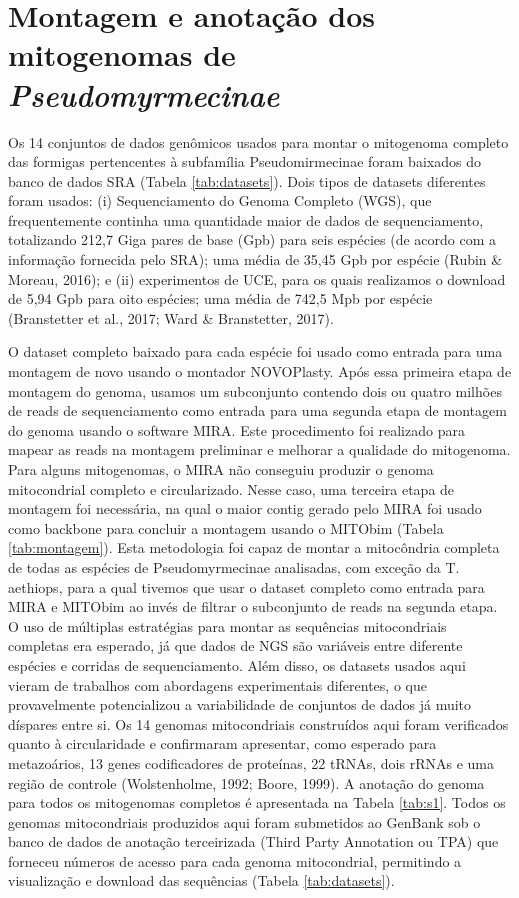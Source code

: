 \documentclass[../DISSERTACAO_MAIN.tex]{subfiles}
\begin{document}
	
\section{Montagem e anotação dos mitogenomas de \textit{Pseudomyrmecinae}}
	
	Os 14 conjuntos de dados genômicos usados para montar o mitogenoma completo das formigas pertencentes à subfamília Pseudomirmecinae foram baixados do banco de dados SRA (Tabela \ref{tab:datasets}). Dois tipos de datasets diferentes foram usados: (i) Sequenciamento do Genoma Completo (WGS), que frequentemente continha uma quantidade maior de dados de sequenciamento, totalizando 212,7 Giga pares de base (Gpb) para seis espécies (de acordo com a informação fornecida pelo SRA); uma média de 35,45 Gpb por espécie (Rubin \& Moreau, 2016); e (ii) experimentos de UCE, para os quais realizamos o download  de 5,94 Gpb para oito espécies; uma média de 742,5 Mpb por espécie (Branstetter et al., 2017; Ward \& Branstetter, 2017).
	
	O dataset completo baixado para cada espécie foi usado como entrada para uma montagem de novo usando o montador NOVOPlasty. Após essa primeira etapa de montagem do genoma, usamos um subconjunto contendo dois ou quatro milhões de reads de sequenciamento como entrada para uma segunda etapa de montagem do genoma usando o software MIRA. Este procedimento foi realizado para mapear as reads na montagem preliminar e melhorar a qualidade do mitogenoma. Para alguns mitogenomas, o MIRA não conseguiu produzir o genoma mitocondrial completo e circularizado. Nesse caso, uma terceira etapa de montagem foi necessária, na qual o maior contig gerado pelo MIRA foi usado como backbone para concluir a montagem usando o MITObim (Tabela \ref{tab:montagem}). Esta metodologia foi capaz de montar a mitocôndria completa de todas as espécies de Pseudomyrmecinae analisadas, com exceção da T. aethiops, para a qual tivemos que usar o dataset completo como entrada para MIRA e MITObim ao invés de filtrar o subconjunto de reads na segunda etapa. O uso de múltiplas estratégias para montar as sequências mitocondriais completas era esperado, já que dados de NGS são variáveis entre diferente espécies e corridas de sequenciamento. Além disso, os datasets usados aqui vieram de trabalhos com abordagens experimentais diferentes, o que provavelmente potencializou a variabilidade de conjuntos de dados já muito díspares entre si. Os 14 genomas mitocondriais construídos aqui foram verificados quanto à circularidade e confirmaram apresentar, como esperado para metazoários, 13 genes codificadores de proteínas, 22 tRNAs, dois rRNAs e uma região de controle (Wolstenholme, 1992; Boore, 1999). A anotação do genoma para todos os mitogenomas completos é apresentada na Tabela \ref{tab:s1}. Todos os genomas mitocondriais produzidos aqui foram submetidos ao GenBank sob o banco de dados de anotação terceirizada (Third Party Annotation ou TPA) \cite{Cochrane2006} que forneceu números de acesso para cada genoma mitocondrial, permitindo a visualização e download das sequências (Tabela \ref{tab:datasets}). 
	
\end{document}

